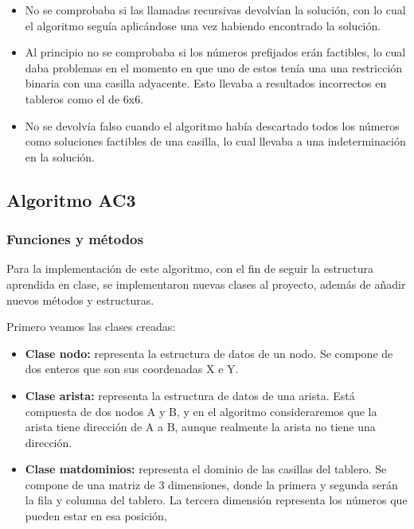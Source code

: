 \documentclass[12pt]{article}
\begin{document}
\begin{itemize}
    \item No se comprobaba si las llamadas recursivas devolvían la solución, con lo cual el algoritmo seguía aplicándose 
    una vez habiendo encontrado la solución.

    \item Al principio no se comprobaba si los números prefijados erán factibles, lo cual daba problemas en el momento 
    en que uno de estos tenía una una restricción binaria con una casilla adyacente. Esto llevaba a resultados incorrectos en 
    tableros como el de 6x6.

    \item No se devolvía falso cuando el algoritmo había descartado todos los números como soluciones factibles de una casilla, lo 
    cual llevaba a una indeterminación en la solución.
\end{itemize}

\subsection{Algoritmo AC3}

\subsubsection{Funciones y métodos}

Para la implementación de este algoritmo, con el fin de seguir la estructura aprendida en clase, se implementaron 
nuevas clases al proyecto, además de añadir nuevos métodos y estructuras.

Primero veamos las clases creadas:

\begin{itemize}
    \item \textbf{Clase nodo:} representa la estructura de datos de un nodo. Se compone de dos enteros que son
    sus coordenadas X e Y.
    \item \textbf{Clase arista:} representa la estructura de datos de una arista. Está compuesta de dos nodos A y B, y
    en el algoritmo consideraremos que la arista tiene dirección de A a B, aunque realmente la arista no tiene una dirección.
    
    \item \textbf{Clase matdominios:} representa el dominio de las casillas del tablero. Se compone de una matriz de 3 dimensiones, 
    donde la primera y segunda serán la fila y columna del tablero. La tercera dimensión representa los números que pueden estar en 
    esa posición, 
\end{itemize}
\end{document}
